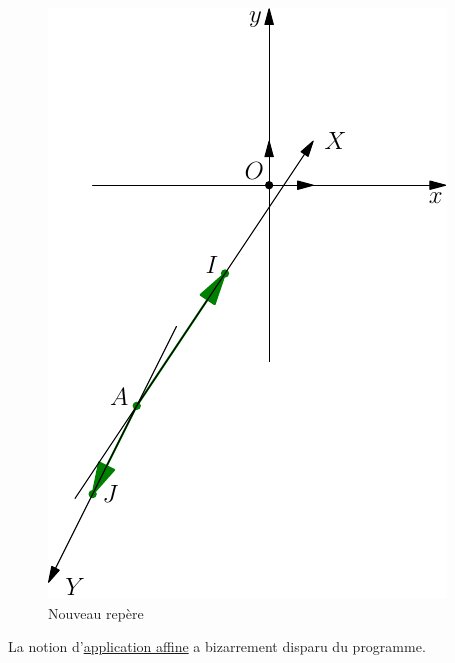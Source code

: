 \begin{figure}[h!]
  \centering
  \includegraphics{C9895_1.pdf}
  \caption{Nouveau repère}
  \label{fig:C9895_1}
\end{figure}






La notion d'\href{\baseurl C5727.pdf}{application affine} a bizarrement disparu du programme. 

